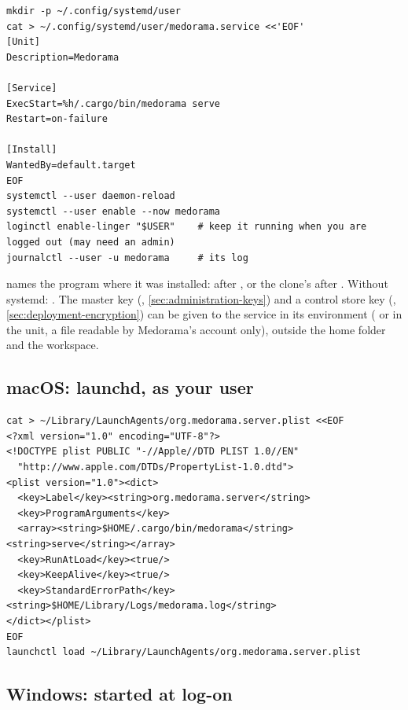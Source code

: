 \begin{lstlisting}[style=shell]
mkdir -p ~/.config/systemd/user
cat > ~/.config/systemd/user/medorama.service <<'EOF'
[Unit]
Description=Medorama

[Service]
ExecStart=%h/.cargo/bin/medorama serve
Restart=on-failure

[Install]
WantedBy=default.target
EOF
systemctl --user daemon-reload
systemctl --user enable --now medorama
loginctl enable-linger "$USER"    # keep it running when you are logged out (may need an admin)
journalctl --user -u medorama     # its log
\end{lstlisting}
 names the program where it was installed:  after
, or the clone's  after
. Without systemd: .
The master key (, \cref{sec:administration-keys}) and a control
store key (, \cref{sec:deployment-encryption}) can be given to the service
in its environment ( or  in the unit, a file readable
by Medorama's account only), outside the home folder and the workspace.

\subsection{macOS: launchd, as your user}
\label{sec:deployment-launchd}

\begin{lstlisting}[style=shell]
cat > ~/Library/LaunchAgents/org.medorama.server.plist <<EOF
<?xml version="1.0" encoding="UTF-8"?>
<!DOCTYPE plist PUBLIC "-//Apple//DTD PLIST 1.0//EN"
  "http://www.apple.com/DTDs/PropertyList-1.0.dtd">
<plist version="1.0"><dict>
  <key>Label</key><string>org.medorama.server</string>
  <key>ProgramArguments</key>
  <array><string>$HOME/.cargo/bin/medorama</string><string>serve</string></array>
  <key>RunAtLoad</key><true/>
  <key>KeepAlive</key><true/>
  <key>StandardErrorPath</key><string>$HOME/Library/Logs/medorama.log</string>
</dict></plist>
EOF
launchctl load ~/Library/LaunchAgents/org.medorama.server.plist
\end{lstlisting}

\subsection{Windows: started at log-on}
\label{sec:deployment-windows}

